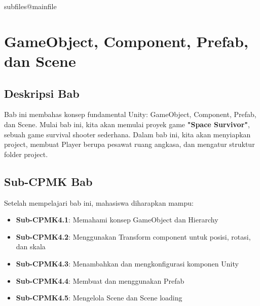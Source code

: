 \documentclass[../../main.tex]{subfiles}
\begin{document}
\ifcsname subfiles@mainfile\endcsname\else
    \setcounter{chapter}{3}
\fi
\chapter{GameObject, Component, Prefab, dan Scene}

\section{Deskripsi Bab}

Bab ini membahas konsep fundamental Unity: GameObject, Component, Prefab, dan Scene. 
Mulai bab ini, kita akan memulai proyek game \textbf{"Space Survivor"}, sebuah game survival shooter sederhana.
Dalam bab ini, kita akan menyiapkan project, membuat Player berupa pesawat ruang angkasa, dan mengatur struktur folder project.

\section{Sub-CPMK Bab}

Setelah mempelajari bab ini, mahasiswa diharapkan mampu:
\begin{itemize}
\item \textbf{Sub-CPMK4.1}: Memahami konsep GameObject dan Hierarchy
\item \textbf{Sub-CPMK4.2}: Menggunakan Transform component untuk posisi, rotasi, dan skala
\item \textbf{Sub-CPMK4.3}: Menambahkan dan mengkonfigurasi komponen Unity
\item \textbf{Sub-CPMK4.4}: Membuat dan menggunakan Prefab
\item \textbf{Sub-CPMK4.5}: Mengelola Scene dan Scene loading
\end{itemize}









\end{document}

